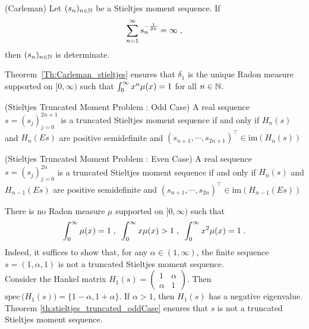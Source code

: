 \documentclass[11pt]{amsart}
\newcommand{\spec}{\mathrm{spec}\,}
\begin{document}
\begin{theorem}(Carleman)
Let $(s_n)_{n \in \mathbb{N}}$ be a Stieltjes moment sequence. If 
    \begin{equation*}
        \sum_{n = 1}^\infty s_n^{-\frac{1}{2n}} = \infty
        \; ,
    \end{equation*}
then $(s_n)_{n \in \mathbb{N}}$ is determinate.
\label{Th:Carleman_stieltjes}
\end{theorem}

\begin{example}
Theorem~\ref{Th:Carleman_stieltjes} ensures that $\delta_1$ is the unique Radon measure supported on $[0, \infty)$ such that 
    $\int_0^\infty x^n \mathrm \mu(x) = 1$ for all $n \in \mathbb{N}$.
\end{example}

\begin{theorem}(Stieltjes Truncated Moment Problem : Odd Case)
A real sequence $s = (s_j)_{j = 0}^{2n + 1}$ is a truncated Stieltjes moment sequence if and only if
    $H_n(s)$ and $H_n(Es)$ are positive semidefinite and 
    $(s_{n+1}, \cdots, s_{2n+1})^\top \in \text{im}(H_n(s))$
    \label{th:stieltjes_truncated_oddCase}
\end{theorem}

\begin{theorem}(Stieltjes Truncated Moment Problem : Even Case)
A real sequence $s = (s_j)_{j = 0}^{2n}$ is a truncated Stieltjes moment sequence if and only if
    $H_n(s)$ and $H_{n-1}(Es)$ are positive semidefinite and 
    $(s_{n+1}, \cdots, s_{2n})^\top \in \text{im}(H_{n-1}(Es))$
    \label{th:stieltjes_truncated_evenCase}
\end{theorem}

\begin{example}
There is no Radon measure $\mu$ supported on $[0, \infty)$ such that 
    \begin{equation}
        \int_0^\infty \mathrm \mu(x) = 1 
        \; , \enspace
        \int_0^\infty x \mathrm \mu(x) > 1 
        \; , \enspace
        \int_0^\infty x^2 \mathrm \mu(x) = 1 
        \; .
    \end{equation}
Indeed, it suffices to show that, for any $\alpha \in (1, \infty)$, the finite sequence $s= (1, \alpha, 1)$ is not a truncated Stieltjes moment sequence. \\
Consider the Hankel matrix 
    $H_1(s) = \begin{pmatrix}
    1 & \alpha \\
    \alpha & 1
    \end{pmatrix}$. Then $\spec \big( H_1(s) \big) = \{1-\alpha, 1 + \alpha\}$.
    If $\alpha > 1$, then $H_1(s)$ has a negative eigenvalue. Theorem \ref{th:stieltjes_truncated_oddCase} ensures that $s$ is not a truncated Stieltjes moment sequence.
\end{example}




\end{document}
